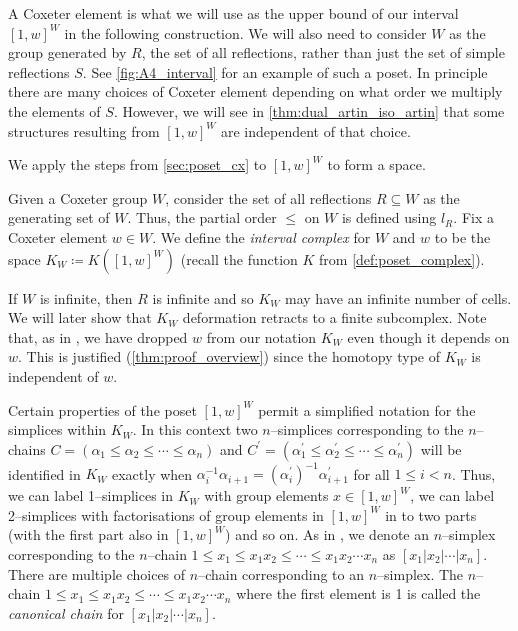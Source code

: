 \documentclass[class=article, crop=false]{standalone}
\begin{document}
A Coxeter element is what we will use as the upper bound of our interval $[1,w]^W$ in the following construction. We will also need to consider $W$ as the group generated by $R$, the set of all reflections, rather than just the set of simple reflections $S$. See \cref{fig:A4_interval} for an example of such a poset. In principle there are many choices of Coxeter element depending on what order we multiply the elements of $S$.
However, we will see in \cref{thm:dual_artin_iso_artin} that some structures resulting from $[1,w]^W$ are independent of that choice.

We apply the steps from \cref{sec:poset_cx} to $[1,w]^W$ to form a space.

\begin{definition}
	Given a Coxeter group $W$, consider the set of all reflections $R\subseteq W$ as the generating set of $W$. Thus, the partial order $\leq$ on $W$ is defined using $l_R$. Fix a Coxeter element $w \in W$. We define the \emph{interval complex} for $W$ and $w$ to be the space $K_{W} \coloneq K([1,w]^W)$ (recall the function $K$ from \cref{def:poset_complex}).
	\label{def:interval_complex}
\end{definition}

If $W$ is infinite, then $R$ is infinite and so $K_W$ may have an infinite number of cells. We will later show that $K_W$ deformation retracts to a finite subcomplex. Note that, as in \cite{paolini_salvetti_kpi1_2021}, we have dropped $w$ from our notation $K_{W}$ even though it depends on $w$. This is justified (\cref{thm:proof_overview}) since the homotopy type of $K_W$ is independent of $w$.

Certain properties of the poset $[1,w]^W$ permit a simplified notation for the simplices within $K_{W}$. In this context two $n$--simplices corresponding to the $n$--chains $C=(\alpha_1 \leq \alpha_2 \leq \cdots \leq \alpha_n)$ and $C^\prime = (\alpha_1^\prime \leq \alpha_2^\prime \leq \cdots \leq \alpha_n^\prime)$ will be identified in $K_W$ exactly when $\alpha_i^{-1}\alpha_{i+1} = (\alpha^\prime_i)^{-1}\alpha^\prime_{i+1}$ for all $1\leq i <n$. Thus, we can label 1--simplices in $K_{W}$ with group elements $x \in [1,w]^W$, we can label 2--simplices with factorisations of group elements in $[1,w]^W$ in to two parts (with the first part also in $[1,w]^W$) and so on.
As in \cite[Definition 2.8]{paolini_salvetti_kpi1_2021}, we denote an $n$--simplex corresponding to the $n$--chain $1 \leq x_1 \leq x_1x_2 \leq \cdots \leq x_1x_2\cdots x_n$ as $[x_1 | x_2 | \cdots | x_n]$. There are multiple choices of $n$--chain corresponding to an $n$--simplex.
The $n$--chain $1 \leq x_1 \leq x_1x_2 \leq \cdots \leq x_1x_2\cdots x_n$ where the first element is 1 is called the \emph{canonical chain} for $[x_1 | x_2 | \cdots | x_n]$.
\end{document}
